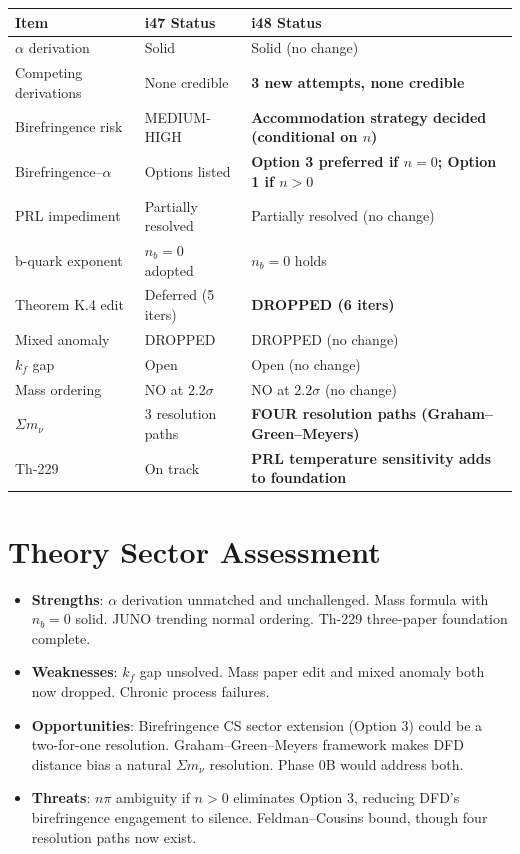 \documentclass[11pt,a4paper]{article}
\begin{document}
\begin{center}
\begin{tabular}{lll}
\toprule
\textbf{Item} & \textbf{i47 Status} & \textbf{i48 Status} \\
\midrule
$\alpha$ derivation & Solid & Solid (no change) \\
Competing derivations & None credible & \textbf{3 new attempts, none credible} \\
Birefringence risk & MEDIUM-HIGH & \textbf{Accommodation strategy decided (conditional on $n$)} \\
Birefringence--$\alpha$ & Options listed & \textbf{Option 3 preferred if $n=0$; Option 1 if $n>0$} \\
PRL impediment & Partially resolved & Partially resolved (no change) \\
b-quark exponent & $n_b = 0$ adopted & $n_b = 0$ holds \\
Theorem K.4 edit & Deferred (5 iters) & \textbf{DROPPED (6 iters)} \\
Mixed anomaly & DROPPED & DROPPED (no change) \\
$k_f$ gap & Open & Open (no change) \\
Mass ordering & NO at $2.2\sigma$ & NO at $2.2\sigma$ (no change) \\
$\Sigma m_\nu$ & 3 resolution paths & \textbf{FOUR resolution paths (Graham--Green--Meyers)} \\
Th-229 & On track & \textbf{PRL temperature sensitivity adds to foundation} \\
\bottomrule
\end{tabular}
\end{center}

\section{Theory Sector Assessment}

\begin{itemize}
\item \textbf{Strengths}: $\alpha$ derivation unmatched and unchallenged. Mass formula with $n_b = 0$ solid. JUNO trending normal ordering. Th-229 three-paper foundation complete.
\item \textbf{Weaknesses}: $k_f$ gap unsolved. Mass paper edit and mixed anomaly both now dropped. Chronic process failures.
\item \textbf{Opportunities}: Birefringence CS sector extension (Option 3) could be a two-for-one resolution. Graham--Green--Meyers framework makes DFD distance bias a natural $\Sigma m_\nu$ resolution. Phase 0B would address both.
\item \textbf{Threats}: $n\pi$ ambiguity if $n > 0$ eliminates Option 3, reducing DFD's birefringence engagement to silence. Feldman--Cousins bound, though four resolution paths now exist.
\end{itemize}
\end{document}
